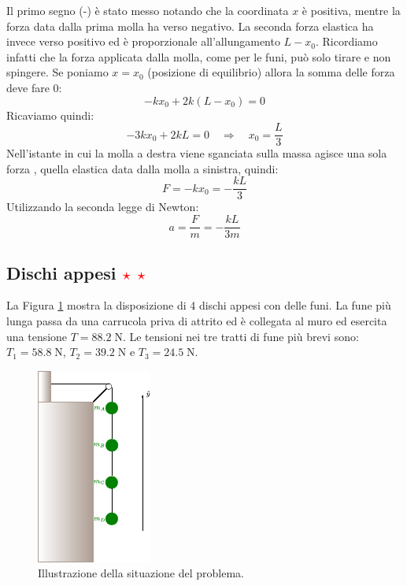 \documentclass[12pt,a4paper]{book}
\newcommand{\rstar}{ \textcolor{red}{$\star$}}
\begin{document}
Il primo segno (-) è stato messo notando che la coordinata $x$ è positiva, mentre la forza data dalla prima molla ha verso negativo. La seconda forza elastica ha invece verso positivo ed è proporzionale all'allungamento
$L-x_0$. Ricordiamo infatti che la forza applicata dalla molla, come per le funi, può solo tirare e non spingere. Se poniamo $x=x_0$ (posizione di equilibrio) allora la somma delle forza deve fare 0:
\begin{equation*}
-kx_0+ 2k(L-x_0)=0 
\end{equation*}
Ricaviamo quindi:
\begin{equation*}
-3kx_0+ 2kL=0 \quad \Rightarrow \quad x_0=\frac{L}{3}
\end{equation*}
Nell'istante in cui la molla a destra viene sganciata sulla massa agisce una sola forza , quella elastica data dalla
molla a sinistra, quindi: 
\begin{equation*}
F=-kx_0=-\frac{kL}{3}
\end{equation*}
Utilizzando la seconda legge di Newton:
\begin{equation*}
a=\frac{F}{m}=-\frac{kL}{3m}
\end{equation*}

\subsection{Dischi appesi \rstar \rstar}
La Figura \ref{fig:4-p-3-1} mostra la disposizione di 4 dischi appesi con delle funi. La fune più lunga passa da una carrucola priva di attrito ed è collegata al muro ed esercita una tensione $T=88.2\;\text{N}$. Le tensioni nei tre tratti di fune più brevi sono: $T_1=58.8\;\text{N}$, $T_2=39.2\;\text{N}$ e $T_3=24.5\;\text{N}$.

\begin{figure}[!ht]
\centering
\includegraphics[scale=1.8]{p-3-1.pdf}
\caption{Illustrazione della situazione del problema.} 
\label{fig:4-p-3-1} 
\end{figure}
\end{document}
